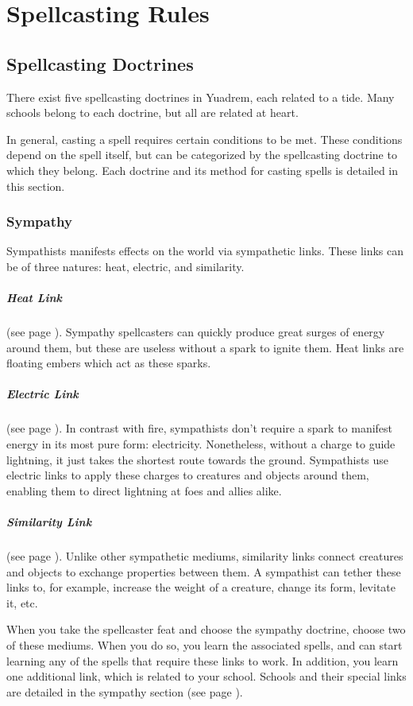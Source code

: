 \section{Spellcasting Rules} \label{sec::spellcastingrules}
\subsection*{Spellcasting Doctrines}
    There exist five spellcasting doctrines in Yuadrem, each related to a tide.
    Many schools belong to each doctrine, but all are related at heart.

    In general, casting a spell requires certain conditions to be met.
    These conditions depend on the spell itself, but can be categorized by the spellcasting doctrine to which they belong.
    Each doctrine and its method for casting spells is detailed in this section.

    \subsubsection{Sympathy}
        Sympathists manifests effects on the world via sympathetic links.
        These links can be of three natures: heat, electric, and similarity.

        \subparagraph{Heat Link}
        (see page \pageref{spell::ember}).
        Sympathy spellcasters can quickly produce great surges of energy around them, but these are useless without a spark to ignite them.
        Heat links are floating embers which act as these sparks.

        \subparagraph{Electric Link}
        (see page \pageref{spell::charge}).
        In contrast with fire, sympathists don't require a spark to manifest energy in its most pure form: electricity.
        Nonetheless, without a charge to guide lightning, it just takes the shortest route towards the ground.
        Sympathists use electric links to apply these charges to creatures and objects around them, enabling them to direct lightning at foes and allies alike.

        \subparagraph{Similarity Link}
        (see page \pageref{spell::tether}).
        Unlike other sympathetic mediums, similarity links connect creatures and objects to exchange properties between them.
        A sympathist can tether these links to, for example, increase the weight of a creature, change its form, levitate it, etc.

        When you take the spellcaster feat and choose the sympathy doctrine, choose two of these mediums.
        When you do so, you learn the associated spells, and can start learning any of the spells that require these links to work.
        In addition, you learn one additional link, which is related to your school.
        Schools and their special links are detailed in the sympathy section (see page \pageref{sec::sympathy}).

